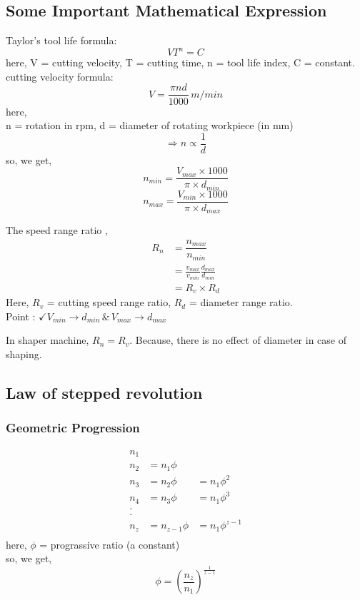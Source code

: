 \documentclass{article}
\begin{document}
\subsection*{Some Important Mathematical Expression}
Taylor's tool life formula: 
$$VT^n = C$$
here, V = cutting velocity, T = cutting time, n = tool life index, C = constant.\\
cutting velocity formula: 
$$V = \frac{\pi n d}{1000} \, m/min$$
here, \\
n = rotation in rpm, d = diameter of rotating workpiece (in mm)\\
$$\Rightarrow n \propto \frac{1}{d}$$
so, we get, 
$$n_{min} = \frac{V_{max} \times 1000}{\pi \times d_{min}}$$
$$n_{max} = \frac{V_{min} \times 1000}{\pi \times d_{max}}$$

The speed range ratio ,
\begin{align*}
  R_n &= \dfrac{n_{max}}{n_{min}}\\
  &= \frac{v_{max}}{v_{min}} \frac{d_{max}}{d_{min}} \\
  &= R_v \times R_d
\end{align*}
Here, $R_v$ = cutting speed range ratio, $R_d$ = diameter range ratio.\\
Point : $\checkmark V_{min} \rightarrow d_{min}\, \& \, V_{max} \rightarrow d_{max}$   


\textbullet In shaper machine, $R_n = R_v$. Because, there is no effect of diameter in case of shaping. 

\subsection*{Law of stepped revolution}
\subsubsection*{Geometric Progression}
\begin{align*}
  n_1 \\
  n_2 &= n_1 \phi \\
  n_3 &= n_2 \phi &= n_1 \phi^2\\ 
  n_4 &= n_3 \phi &= n_1 \phi^3\\
  .\\
  .\\
  n_z &= n_{z-1} \phi &= n_1 \phi^{z-1}\\
\end{align*}
here, $\phi$ = prograssive ratio (a constant) \\
so, we get, $$\phi = \left(\frac{n_z}{n_1}\right)^{\frac{1}{z-1}}$$
\end{document}

